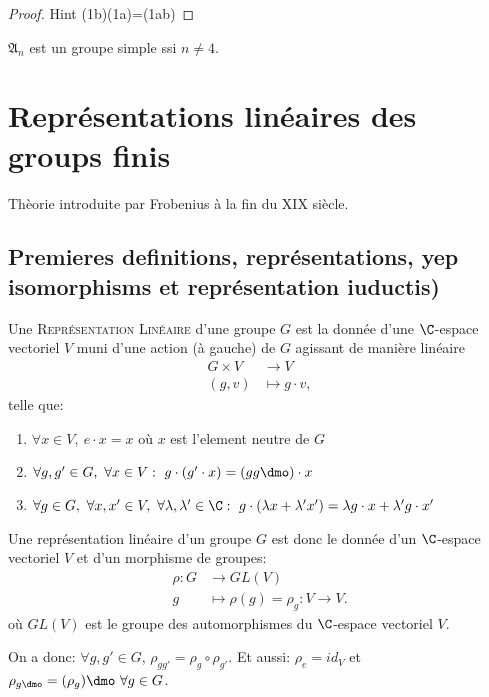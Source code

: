 \begin{proof}
	Hint (1b)(1a)=(1ab)
\end{proof}

\begin{theorem}[Galois]
	$\mathfrak{A}_n$ est un groupe simple ssi $n\neq 4$.
\end{theorem}

\chapter{Représentations linéaires des groups finis}

Thèorie introduite par Frobenius à la fin du XIX siècle.

\section{Premieres definitions, représentations, yep isomorphisms et représentation iuductis)} %
\label{sec:premieres_definitions_représentations_yep_isomorphisms_et_rep_iuductis}

\begin{definition}
	Une \textsc{Représentation Linéaire} d'une groupe $G$ est la donnée d'une $\C$-espace vectoriel $V$ muni d'une action (à gauche) de $G$ agissant de manière linéaire
	\begin{align*}
		G\times V & \rightarrow V \\
		(g,v) & \mapsto g\cdot v,		
	\end{align*}
	telle que:
	\begin{enumerate}
		\item $\forall x\in V,\ e\cdot x=x$ où $x$ est l'element neutre de $G$
		\item $\forall g, g' \in G,\ \forall x\in V:\ g\cdot (g'\cdot x)=(gg\dmo)\cdot x$
		\item $\forall g\in G,\ \forall x,x'\in V,\ \forall \lambda,\lambda'\in\C:\ g\cdot(\lambda x+\lambda'x')=\lambda g\cdot x+\lambda' g\cdot x'$
	\end{enumerate}
\end{definition}

\begin{definition}
Une représentation linéaire d'un groupe $G$ est donc le donnée d'un $\C$-espace vectoriel $V$ et d'un morphisme de groupes:
\begin{align*}
	\rho:G &\rightarrow GL(V)\\
	g &\mapsto \rho(g)=\rho_g:V\rightarrow V.	
\end{align*}                
où $GL(V)$ est le groupe des automorphismes du $\C$-espace vectoriel $V$.

On a donc: $\forall g,g'\in G$, $\rho_{gg'}=\rho_g\circ \rho_{g'}$. Et aussi: $\rho_e=id_V$ et $\rho_{g\dmo}=(\rho_g)\dmo\ \forall g\in G$.
\end{definition}

